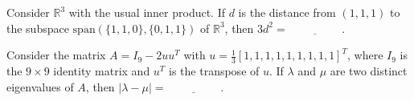 \vspace{0.5cm}
\item Consider $\mathbb{R}^3$ with the usual inner product. If $d$ is the distance from $(1, 1, 1)$ to the subspace $\text{span}(\{1, 1, 0\}, \{0, 1, 1\})$ of $\mathbb{R}^3$, then $3d^2 = \underline{\hspace{2cm}}$.
\vspace{0.5cm}
\item Consider the matrix $A = I_9 - 2u u^T$ with $u = \frac{1}{3} [1, 1, 1, 1, 1, 1, 1, 1, 1]^T$, where $I_9$ is the $9 \times 9$ identity matrix and $u^T$ is the transpose of $u$. If $\lambda$ and $\mu$ are two distinct eigenvalues of $A$, then
$|\lambda - \mu| = \underline{\hspace{2cm}}.$


